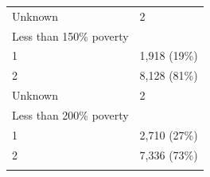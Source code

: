 \documentclass[]{article}
\begin{document}
\begin{longtable}[]{@{}ll@{}}
\begin{minipage}[t]{0.71\columnwidth}
Unknown\strut
\end{minipage} & \begin{minipage}[t]{0.23\columnwidth}\raggedright
2\strut
\end{minipage}\tabularnewline
\begin{minipage}[t]{0.71\columnwidth}\raggedright
Less than 150\% poverty\strut
\end{minipage} & \begin{minipage}[t]{0.23\columnwidth}\raggedright
\strut
\end{minipage}\tabularnewline
\begin{minipage}[t]{0.71\columnwidth}\raggedright
1\strut
\end{minipage} & \begin{minipage}[t]{0.23\columnwidth}\raggedright
1,918 (19\%)\strut
\end{minipage}\tabularnewline
\begin{minipage}[t]{0.71\columnwidth}\raggedright
2\strut
\end{minipage} & \begin{minipage}[t]{0.23\columnwidth}\raggedright
8,128 (81\%)\strut
\end{minipage}\tabularnewline
\begin{minipage}[t]{0.71\columnwidth}\raggedright
Unknown\strut
\end{minipage} & \begin{minipage}[t]{0.23\columnwidth}\raggedright
2\strut
\end{minipage}\tabularnewline
\begin{minipage}[t]{0.71\columnwidth}\raggedright
Less than 200\% poverty\strut
\end{minipage} & \begin{minipage}[t]{0.23\columnwidth}\raggedright
\strut
\end{minipage}\tabularnewline
\begin{minipage}[t]{0.71\columnwidth}\raggedright
1\strut
\end{minipage} & \begin{minipage}[t]{0.23\columnwidth}\raggedright
2,710 (27\%)\strut
\end{minipage}\tabularnewline
\begin{minipage}[t]{0.71\columnwidth}\raggedright
2\strut
\end{minipage} & \begin{minipage}[t]{0.23\columnwidth}\raggedright
7,336 (73\%)\strut
\end{minipage}\tabularnewline
\begin{minipage}[t]{0.71\columnwidth}\raggedright

\end{minipage}
\end{longtable}
\end{document}
